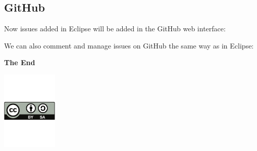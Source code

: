 \documentclass{beamer}
\begin{document}
\subsection{GitHub}
\begin{frame}
  Now issues added in Eclipse will be added in the GitHub web interface:

\end{frame}

\begin{frame}
  We can also comment and manage issues on GitHub the same way as in Eclipse:

\end{frame}

\begin{frame}
  \begin{center}
  {\bfseries \Huge The End}
  \vspace{1cm}

  \includegraphics[width=0.2\textwidth]{cc-by-sa.pdf}
  \end{center}
\end{frame}
\end{document}
